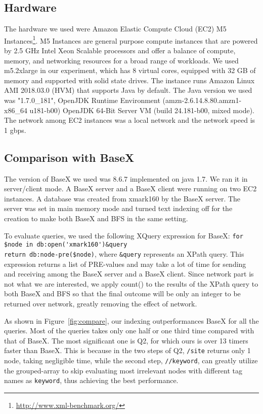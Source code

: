 \subsection{Hardware} 

The hardware we used were Amazon Elastic Compute Cloud (EC2) M5
Instances\footnote{\url{http://www.xml-benchmark.org/}}. M5 Instances are
general purpose compute instances that are powered by 2.5 GHz Intel Xeon
Scalable processors and offer a balance of compute, memory, and networking
resources for a broad range of workloads.  We used m5.2xlarge in our experiment,
which has 8 virtual cores, equipped with 32 GB of memory and supported with
solid state drives.  The instance runs Amazon Linux AMI 2018.03.0 (HVM) that
supports Java by default. The Java version we used was "1.7.0\_181", OpenJDK
Runtime Environment (amzn-2.6.14.8.80.amzn1-x86\_64 u181-b00) OpenJDK 64-Bit
Server VM (build 24.181-b00, mixed mode). The network among EC2 instances was a
local network and the network speed is 1 gbps.
 

\subsection{Comparison with BaseX}

The version of BaseX we used was 8.6.7 implemented on java 1.7. We ran it in
server/client mode. A BaseX server and a BaseX client were running on two EC2
instances. A database was created from xmark160 by the BaseX server. The server
was set in main memory mode and turned text indexing off for the creation to
make both BaseX and BFS in the same setting.

To evaluate queries, we used the following XQuery expression for BaseX:  
\verb|for $node in db:open('xmark160')&query|\\
\verb|return db:node-pre($node)|, where  \verb|&query|
represents an XPath query. This expression returns a list of PRE-values and may
take a lot of time for sending and receiving among the BaseX server and a BaseX
client. Since network part is not what we are interested, we apply count() to
the results of the XPath query to both BaseX and BFS so that the final outcome
will be only an integer to be returned over network, greatly removing the effect
of network.

As shown in Figure~\ref{fig:compare}, our indexing outperformances BaseX for all
the queries. Most of the queries takes only one half or one third time compared
with that of BaseX. The most significant one is Q2, for which ours is over 13
timers faster than BaseX. This is because in the two steps of Q2, \texttt{/site}
returns only 1 node, taking negligible time, while the second step,
\texttt{//keyword}, can greatly utilize the grouped-array to skip evaluating
most irrelevant nodes with different tag names as \texttt{keyword}, thus
achieving the best performance.


